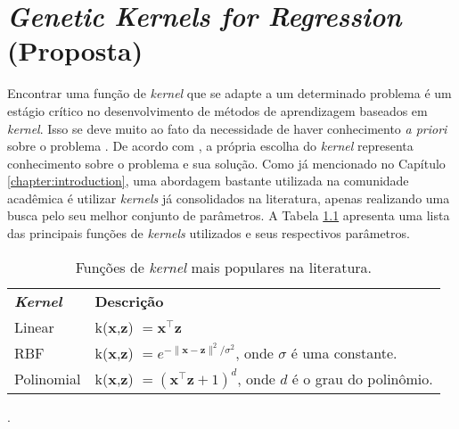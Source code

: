 \chapter{\textit{Genetic Kernels for Regression} (Proposta)} \label{chapter:gkr}

Encontrar uma função de \textit{kernel} que se adapte a um determinado problema é um estágio crítico no desenvolvimento de métodos de aprendizagem baseados em \textit{kernel}. Isso se deve muito ao fato da necessidade de haver conhecimento \textit{a priori} sobre o problema \cite{shawe2004}. De acordo com , a própria escolha do \textit{kernel} representa conhecimento sobre o problema e sua solução. Como já mencionado no Capítulo \ref{chapter:introduction}, uma abordagem bastante utilizada na comunidade acadêmica é utilizar \textit{kernels} já consolidados na literatura, apenas realizando uma busca pelo seu melhor conjunto de parâmetros. A Tabela \ref{tab:commom-kernels} apresenta uma lista das principais funções de \textit{kernels} utilizados e seus respectivos parâmetros.

\begin{table}[H]
    \caption{Funções de \textit{kernel} mais populares na literatura.}
    \begin{center} \label{tab:commom-kernels}
        \begin{tabular}{l@{\hskip 20pt}l}
            \hline\noalign{\smallskip}
            \textbf{\textit{Kernel}} & \textbf{Descrição} \\
            \noalign{\smallskip}
            \hline
            \noalign{\smallskip}
            Linear		& k(${\mathbf x}$,${\mathbf z}$) $= \mathbf{x}^{\top}\mathbf{z}$ \\
            RBF	        & k(${\mathbf x}$,${\mathbf z}$) $= e^{-\|\mathbf{x} - \mathbf{z}\|^2 / \sigma^2}$, onde $\sigma$ é uma constante. \\
            Polinomial	& k(${\mathbf x}$,${\mathbf z}$) $= (\mathbf{x}^{\top}\mathbf{z} + 1)^d$, onde $d$ é o grau do polinômio. \\
            \hline
        \end{tabular}
    \end{center}
    \begin{center}
        .
    \end{center}
\end{table}


